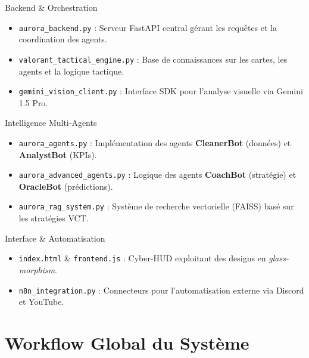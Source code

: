 \documentclass[11pt,a4paper]{article}
\begin{document}
\begin{sectionbox}{Backend \& Orchestration}
    \begin{itemize}[label=\textbullet, leftmargin=15pt]
        \item \texttt{aurora\_backend.py} : Serveur FastAPI central gérant les requêtes et la coordination des agents.
        \item \texttt{valorant\_tactical\_engine.py} : Base de connaissances sur les cartes, les agents et la logique tactique.
        \item \texttt{gemini\_vision\_client.py} : Interface SDK pour l'analyse visuelle via Gemini 1.5 Pro.
    \end{itemize}
\end{sectionbox}

\vspace{1em}

\begin{sectionbox}{Intelligence Multi-Agents}
    \begin{itemize}[label=\textbullet, leftmargin=15pt]
        \item \texttt{aurora\_agents.py} : Implémentation des agents \textbf{CleanerBot} (données) et \textbf{AnalystBot} (KPIs).
        \item \texttt{aurora\_advanced\_agents.py} : Logique des agents \textbf{CoachBot} (stratégie) et \textbf{OracleBot} (prédictions).
        \item \texttt{aurora\_rag\_system.py} : Système de recherche vectorielle (FAISS) basé sur les stratégies VCT.
    \end{itemize}
\end{sectionbox}

\vspace{1em}

\begin{sectionbox}{Interface \& Automatisation}
    \begin{itemize}[label=\textbullet, leftmargin=15pt]
        \item \texttt{index.html} \& \texttt{frontend.js} : Cyber-HUD exploitant des designs en \textit{glass-morphism}.
        \item \texttt{n8n\_integration.py} : Connecteurs pour l'automatisation externe via Discord et YouTube.
    \end{itemize}
\end{sectionbox}

\section{Workflow Global du Système}
\end{document}
